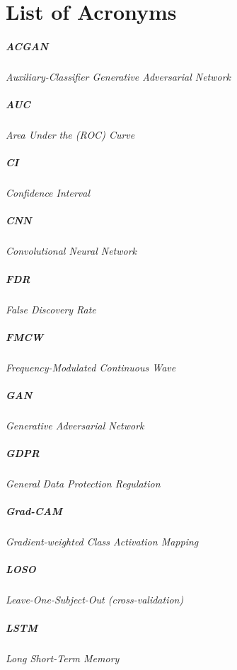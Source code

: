 \chapter{List of Acronyms}
\paragraph{ACGAN} \textit{Auxiliary-Classifier Generative Adversarial Network}
\paragraph{AUC} \textit{Area Under the (ROC) Curve}
\paragraph{CI} \textit{Confidence Interval}
\paragraph{CNN} \textit{Convolutional Neural Network}
\paragraph{FDR} \textit{False Discovery Rate}
\paragraph{FMCW} \textit{Frequency-Modulated Continuous Wave}
\paragraph{GAN} \textit{Generative Adversarial Network}
\paragraph{GDPR} \textit{General Data Protection Regulation}
\paragraph{Grad-CAM} \textit{Gradient-weighted Class Activation Mapping}
\paragraph{LOSO} \textit{Leave-One-Subject-Out (cross-validation)}
\paragraph{LSTM} \textit{Long Short-Term Memory}
